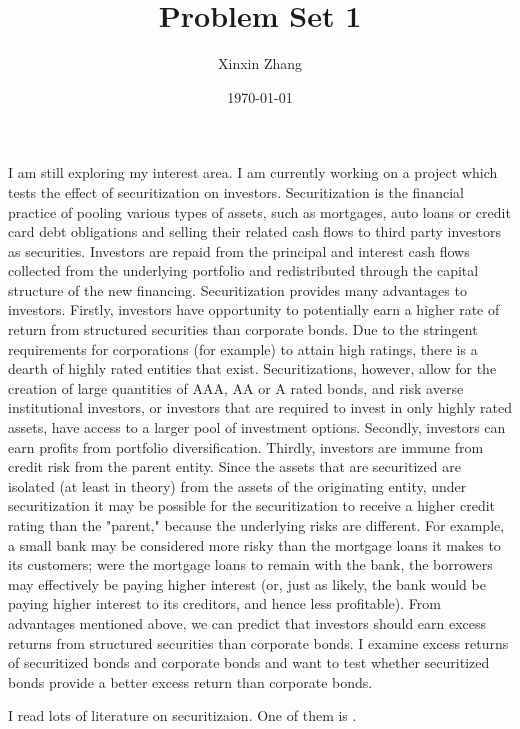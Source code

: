 \documentclass{article}
\begin{document}
\title{Problem Set 1}
\author{Xinxin Zhang}
\date{\today}

\maketitle

I am still exploring my interest area. I am currently working on a project which tests the effect of securitization on investors. Securitization is the financial practice of pooling various types of assets, such as mortgages, auto loans or credit card debt obligations and selling their related cash flows to third party investors as securities. Investors are repaid from the principal and interest cash flows collected from the underlying portfolio and redistributed through the capital structure of the new financing. 
Securitization provides many advantages to investors. Firstly, investors have opportunity to potentially earn a higher rate of return from structured securities than corporate bonds. Due to the stringent requirements for corporations (for example) to attain high ratings, there is a dearth of highly rated entities that exist. Securitizations, however, allow for the creation of large quantities of AAA, AA or A rated bonds, and risk averse institutional investors, or investors that are required to invest in only highly rated assets, have access to a larger pool of investment options. Secondly, investors can earn profits from portfolio diversification.
Thirdly, investors are immune from credit risk from the parent entity. Since the assets that are securitized are isolated (at least in theory) from the assets of the originating entity, under securitization it may be possible for the securitization to receive a higher credit rating than the "parent," because the underlying risks are different. For example, a small bank may be considered more risky than the mortgage loans it makes to its customers; were the mortgage loans to remain with the bank, the borrowers may effectively be paying higher interest (or, just as likely, the bank would be paying higher interest to its creditors, and hence less profitable).
From advantages mentioned above, we can predict that investors should earn excess returns from structured securities than corporate bonds. I examine excess returns of securitized bonds and corporate bonds and want to test whether securitized bonds provide a better excess return than corporate bonds.

I read lots of literature on securitizaion. One of them is \cite{han2015corporate}.
\end{document}
